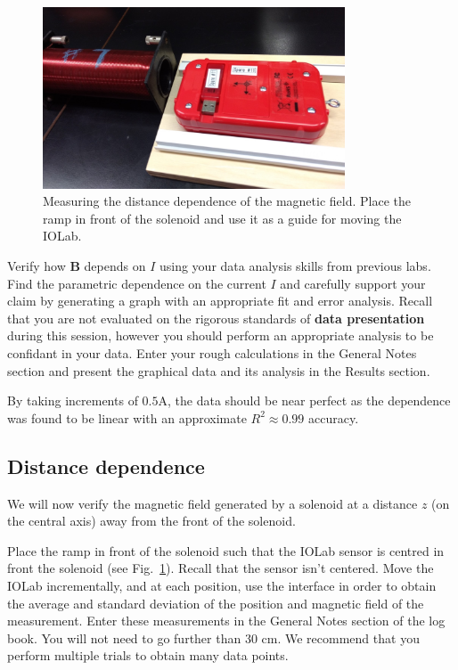 \documentclass[12pt]{report}
\begin{document}
\begin{figure}[h]
\centering
\includegraphics[width=0.8\textwidth]{lab3-sessiona-ramp}
\caption{Measuring the distance dependence of the magnetic field. Place the ramp in front of the solenoid and use it as a guide for moving the IOLab.}
\label{Fig:lab3-sessiona-ramp}
\end{figure}

{\color{blue}Verify how $\mathbf{B}$ depends on $I$ using your data analysis skills from previous labs. Find the parametric dependence on the current $I$ and carefully support your claim by generating a graph with an appropriate fit and error analysis.
Recall that you are not evaluated on the rigorous standards of \textbf{data presentation} during this session, however you should perform an appropriate analysis to be confidant in your data. Enter your rough calculations in the General Notes section and present the graphical data and its analysis in the Results section.}

\begin{tcolorbox}
By taking increments of $0.5$A, the data should be near perfect as the dependence was found to be linear with an approximate $R^2 \approx 0.99$ accuracy.
\end{tcolorbox}

\subsection{Distance dependence}
We will now verify the magnetic field generated by a solenoid at a distance $z$ (on the central axis) away from the front of the solenoid.

Place the ramp in front of the solenoid such that the IOLab sensor is centred in front the solenoid (see Fig.~\ref{Fig:lab3-sessiona-ramp}). 
Recall that the sensor isn't centered. Move the IOLab incrementally, and {\color{blue}at each position, use the interface in order to obtain the average and standard deviation of the position and magnetic field of the measurement. Enter these measurements in the General Notes section of the log book.}
You will not need to go further than 30 cm. We recommend that you perform multiple trials to obtain many data points.
\end{document}
